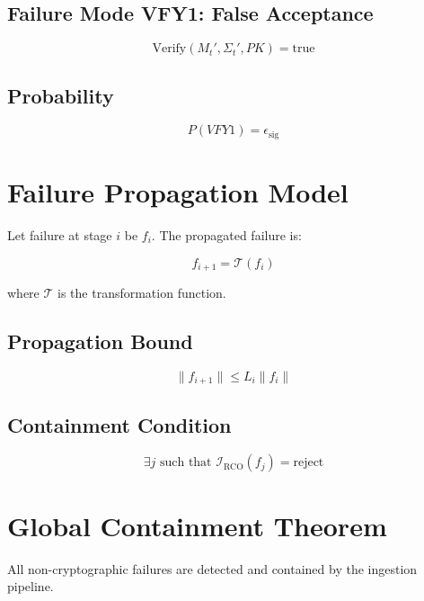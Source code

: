 \subsection{Failure Mode VFY1: False Acceptance}

\begin{equation}
\text{Verify}(M_t', \Sigma_t', PK) = \text{true}
\end{equation}

\subsection{Probability}

\begin{equation}
P(VFY1) = \epsilon_{\text{sig}}
\end{equation}

\section{Failure Propagation Model}

Let failure at stage $i$ be $f_i$. The propagated failure is:

\begin{equation}
f_{i+1} = \mathcal{T}(f_i)
\end{equation}

where $\mathcal{T}$ is the transformation function.

\subsection{Propagation Bound}

\begin{equation}
\|f_{i+1}\| \leq L_i \|f_i\|
\end{equation}

\subsection{Containment Condition}

\begin{equation}
\exists j \text{ such that } \mathcal{I}_{\text{RCO}}(f_j) = \text{reject}
\end{equation}

\section{Global Containment Theorem}

\begin{theorem}
All non-cryptographic failures are detected and contained by the ingestion pipeline.
\end{theorem}

